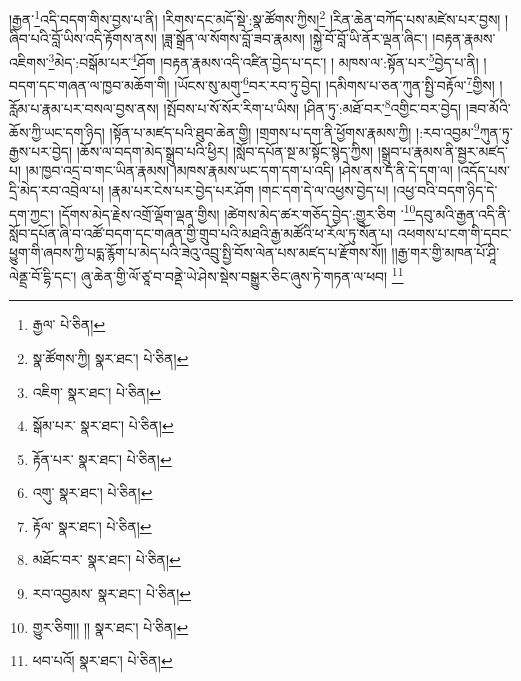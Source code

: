 །རྒྱན་\footnote{རྒྱལ་  པེ་ཅིན། }འདི་བདག་གིས་བྱས་པ་ནི། །རིགས་དང་མདོ་སྡེ་:སྣ་ཚོགས་ཀྱིས།\footnote{སྣ་ཚོགས་ཀྱི།  སྣར་ཐང་།  པེ་ཅིན། } །རིན་ཆེན་བཀོད་པས་མཛེས་པར་བྱས། །ཞིབ་པའི་བློ་ཡིས་འདི་རྟོགས་ནས། །ཟླ་སྒྲོན་ལ་སོགས་བློ་ཟབ་རྣམས། །སྐྱེ་བོ་བློ་ཡི་ནོར་ལྡན་ཞིང་། །བརྟན་རྣམས་འཇིགས་\footnote{འཇིག་  སྣར་ཐང་།  པེ་ཅིན། }མེད་:བསྒོམ་པར་\footnote{སྒོམ་པར་  སྣར་ཐང་།  པེ་ཅིན། }ཤོག །བརྟན་རྣམས་འདི་འཛིན་བྱེད་པ་དང་། །
མཁས་ལ་:སྟོན་པར་\footnote{རྟོན་པར་  སྣར་ཐང་།  པེ་ཅིན། }བྱེད་པ་ནི། །བདག་དང་གཞན་ལ་ཁྱབ་མཆོག་གི། །ཡོངས་སུ་མགུ་\footnote{འགུ་  སྣར་ཐང་།  པེ་ཅིན། }བར་རབ་ཏུ་བྱེད། །དམིགས་པ་ཅན་ཀུན་སྤྱི་བརྟོལ་\footnote{རྟོལ་  སྣར་ཐང་།  པེ་ཅིན། }གྱིས། །རློམ་པ་རྣམ་པར་བསལ་བྱས་ནས། །སྤོབས་པ་སོ་སོར་རིག་པ་ཡིས། །ཤིན་ཏུ་:མཐོ་བར་\footnote{མཐོང་བར་  སྣར་ཐང་།  པེ་ཅིན། }འགྱིང་བར་བྱེད། །ཟབ་མོའི་ཆོས་ཀྱི་ཡང་དག་ཉིད། །སྟོན་པ་མཛད་པའི་ཐུབ་ཆེན་གྱི། །གྲགས་པ་དག་ནི་ཕྱོགས་རྣམས་ཀྱི། །:རབ་འབྱམ་\footnote{རབ་འབྱམས་  སྣར་ཐང་།  པེ་ཅིན། }ཀུན་ཏུ་རྒྱས་པར་བྱེད། །ཆོས་ལ་བདག་མེད་སྒྲུབ་པའི་ཕྱིར། །སློབ་དཔོན་སྔ་མ་སྟོང་སྙེད་ཀྱིས། །སྒྲུབ་པ་རྣམས་ནི་སྦྱར་མཛད་པ། །མ་ཁྱབ་འདྲ་བ་གང་ཡིན་རྣམས། །མཁས་རྣམས་ཡང་དག་དག་པ་འདི། །ཤེས་ནས་ད་ནི་དེ་དག་ལ། །འདོད་པས་དྲི་མེད་རབ་འབྲེལ་པ། །རྣམ་པར་ངེས་པར་བྱེད་པར་ཤོག །གང་དག་དེ་ལ་འཕྱས་བྱེད་པ། །འཕྱ་བའི་བདག་ཉིད་དེ་དག་ཀྱང་། །དོགས་མེད་རྗེས་འགྲོ་ལྡོག་ལྡན་གྱིས། །ཚེགས་མེད་ཚར་གཅོད་བྱེད་:གྱུར་ཅིག ་\footnote{གྱུར་ཅིག།། །།  སྣར་ཐང་།  པེ་ཅིན། }དབུ་མའི་རྒྱན་འདི་ནི་སློབ་དཔོན་ཞི་བ་འཚོ་བདག་དང་གཞན་གྱི་གྲུབ་པའི་མཐའི་རྒྱ་མཚོའི་ཕ་རོལ་ཏུ་སོན་པ། འཕགས་པ་ངག་གི་དབང་ཕྱུག་གི་ཞབས་ཀྱི་པདྨ་རྙོག་པ་མེད་པའི་ཟེའུ་འབྲུ་སྤྱི་བོས་ལེན་པས་མཛད་པ་རྫོགས་སོ།། །།རྒྱ་གར་གྱི་མཁན་པོ་ཤཱི་ལེནྡྲ་བོ་དྷི་དང་། ཞུ་ཆེན་གྱི་ལོ་ཙཱ་བ་བནྡེ་ཡེ་ཤེས་སྡེས་བསྒྱུར་ཅིང་ཞུས་ཏེ་གཏན་ལ་ཕབ། \footnote{ཕབ་པའོ།   སྣར་ཐང་།  པེ་ཅིན། }